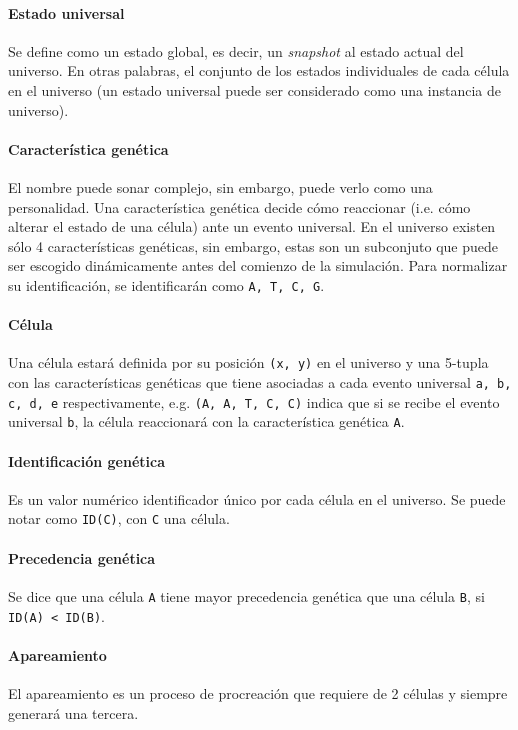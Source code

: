 \documentclass[letterpaper,10pt]{article}
\begin{document}
\paragraph{Estado universal}
Se define como un estado global, es decir, un \emph{snapshot} al estado actual del universo. En otras palabras, el conjunto de los estados individuales de cada célula en el universo (un estado universal puede ser considerado como una instancia de universo).

\paragraph{Característica genética}
El nombre puede sonar complejo, sin embargo, puede verlo como una personalidad. Una característica genética decide cómo reaccionar (i.e. cómo alterar el estado de una célula) ante un evento universal. En el universo existen sólo 4 características genéticas, sin embargo, estas son un subconjuto que puede ser escogido dinámicamente antes del comienzo de la simulación. Para normalizar su identificación, se identificarán como \texttt{A, T, C, G}.

\paragraph{Célula}
Una célula estará definida por su posición \texttt{(x, y)} en el universo y una 5-tupla con las características genéticas que tiene asociadas a cada evento universal \texttt{a, b, c, d, e} respectivamente, e.g. \texttt{(A, A, T, C, C)} indica que si se recibe el evento universal \texttt{b}, la célula reaccionará con la característica genética \texttt{A}.

\paragraph{Identificación genética}
Es un valor numérico identificador único por cada célula en el universo. Se puede notar como \texttt{ID(C)}, con \texttt{C} una célula.

\paragraph{Precedencia genética}
Se dice que una célula \texttt{A} tiene mayor precedencia genética que una célula \texttt{B}, si \texttt{ID(A) < ID(B)}.

\paragraph{Apareamiento}
El apareamiento es un proceso de procreación que requiere de 2 células y siempre generará una tercera.
\end{document}
